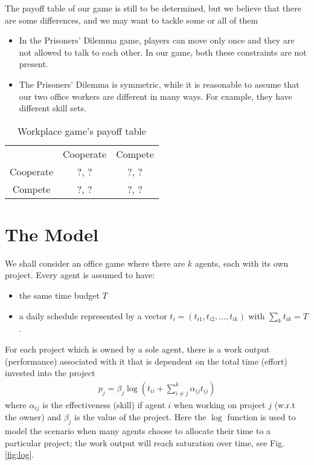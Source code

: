 \documentclass[11pt, a4paper]{article}
\begin{document}
The payoff table of our game is still to be determined, but we believe that there are some differences, and we may want to tackle some or all of them
\begin{itemize}
	\item In the Prisoners' Dilemma game, players can move only once and they are not allowed to talk to each other. In our game, both these constraints are not present.
	\item The Prisoners' Dilemma is symmetric, while it is reasonable to assume that our two office workers are different in many ways. For example, they have different skill sets.
\end{itemize}
\begin{table}[h]
	\centering
	\caption{Workplace game's payoff table}
	\begin{tabular}{c c c}
		          & Cooperate & Compete \\
		Cooperate & ?, ?      & ?, ?    \\
		 Compete  & ?, ?      & ?, ?
	\end{tabular}
\end{table}

\newpage

\section{The Model}
We shall consider an office game where there are $k$ agents, each with its own project. Every agent is assumed to have:
\begin{itemize}
\item the same time budget $T$
\item a daily schedule represented by a vector $t_i=(t_{i1},t_{i2},\ldots,t_{ik})$ with $\sum_{k}t_{ik}=T$.
\end{itemize}

For each project which is owned by a sole agent, there is a work output (performance) associated with it that is dependent on the total time (effort) invested into the project
\begin{align*}
p_j = \beta_j\log\left(t_{ii}+\sum_{i\neq j}^{k}\alpha_{ij}t_{ij}\right)
\end{align*}
where $\alpha_{ij}$ is the effectiveness (skill) if agent $i$ when working on project $j$ (w.r.t the owner) and $\beta_{j}$ is the value of the project. Here the $\log$ function is used to model the scenario when many agents choose to allocate their time to a particular project;  the work output will reach saturation over time, see Fig. \ref{fig:log}.
\end{document}
